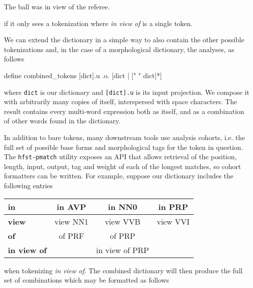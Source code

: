 \documentclass{llncs}
\begin{document}
\begin{exe}
\item The ball was in view of the referee.
  \label{inview}
\end{exe}

\noindent if it only sees a tokenization where \emph{in view of} is a single token.

We can extend the dictionary in a simple way to also contain the other
possible tokenizations and, in the case of a morphological dictionary,
the analyses, as follows

\begin{center}
\begin{framed}
\begin{verb}
define combined_tokens [dict].u .o. [dict | [" " dict]*]  
\end{verb}
\end{framed}
\end{center}

\noindent where \verb+dict+ is our dictionary and \verb+[dict].u+ is its input
projection. We compose it with arbitrarily many copies of itself,
interspersed with space characters. The result contains every multi-word
expression both as itself, and as a combination of other words found
in the dictionary.

In addition to bare tokens, many downstream tools use analysis cohorts, i.e.\@
the full set of possible base forms and morphological tags for the token in
question. The \verb+hfst-pmatch+ utility exposes an API that allows retrieval of the
position, length, input, output, tag and weight of each of the longest matches, 
so cohort formatters can be written. 
For example, suppose our dictionary includes the
following entries

\begin{table}[H]
\begin{center}
\begin{tabular}{| l | c  c  c |}
  \hline
  \textbf{in} & in AVP & in NN0 & in PRP \\
  \hline
  \textbf{view} & view NN1 & view VVB & view VVI \\
  \hline
  \textbf{of} & of PRF & of PRP & \\
  \hline
  \textbf{in view of} & & in view of PRP & \\
  \hline
\end{tabular}
\end{center}
\end{table}

\noindent when tokenizing \emph{in view of}. The combined dictionary will then produce the full
set of combinations which may be formatted as follows
\end{document}
